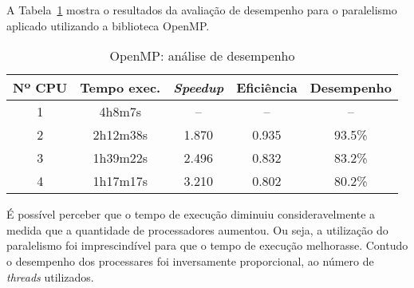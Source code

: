 A Tabela~\ref{tab:analise} mostra o resultados da avaliação de desempenho para o
paralelismo aplicado utilizando a biblioteca OpenMP.

\begin{table}[h]
\centering
\caption{OpenMP: análise de desempenho}
\begin{tabular}{ccccc}
\hline
\textbf{Nº CPU}&\textbf{Tempo exec.}&\textbf{\textit{Speedup}}&\textbf{Eficiência}&\textbf{Desempenho}\\
\hline
1 & 4h8m7s & -- & -- & --  \\
2 & 2h12m38s & 1.870 & 0.935 & 93.5\% \\
3 & 1h39m22s & 2.496 & 0.832 & 83.2\% \\
4 & 1h17m17s & 3.210 & 0.802 & 80.2\% \\ 
\hline
\end{tabular}
\label{tab:analise}
\end{table}

É possível perceber que o tempo de execução diminuiu consideravelmente a medida
que a quantidade de processadores aumentou. Ou seja, a utilização do paralelismo
foi imprescindível para que o tempo de execução melhorasse. Contudo o desempenho
dos processares foi inversamente proporcional, ao número de \textit{threads}
utilizados.
